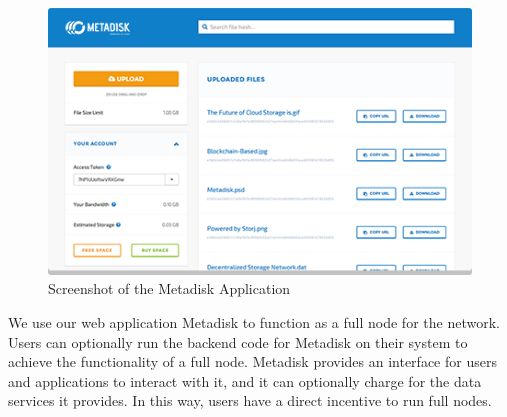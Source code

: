 \documentclass[a4paper,10pt]{article}
\begin{document}
\begin{figure}[h!]
\centering
\includegraphics[width=\linewidth]{6}
\caption{Screenshot of the Metadisk Application}
\end{figure}
We use our web application Metadisk \cite{4} to function as a full node for the network. Users can optionally run the backend code for Metadisk on their system to achieve the functionality of a full node. Metadisk provides an interface for users and applications to interact with it, and it can optionally charge for the data services it provides. In this way, users have a direct incentive to run full nodes.  \\
\end{document}
